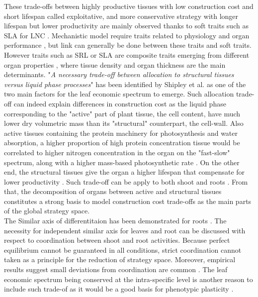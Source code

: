 These trade-offs between highly productive tissues with low construction cost and short lifespan called exploitative, and more conservative strategy with longer lifespan but lower productivity are mainly observed thanks to soft traits such as SLA for LNC \cite{wright_worldwide_2004}. Mechanistic model require traits related to physiology and organ performance \cite{soussana_gemini:_2012, lohier_explaining_2014}, but link can generally be done between these traits and soft traits. However traits such as SRL or SLA are composite traits emerging from different organ properties \cite{ryser_importance_1996,john_anatomical_2017}, where tissue density and organ thickness are the main determinants. "\textit{A necessary trade-off between allocation to structural tissues versus liquid phase processes}" has been identified by Shipley et al. \cite{shipley_fundamental_2006} as one of the two main factors for the leaf economic spectrum to emerge. Such allocation trade-off can indeed explain differences in construction cost as the liquid phase corresponding to the "active" part of plant tissue, the cell content, have much lower dry volumetric mass than its "structural" counterpart, the cell-wall. Also active tissues containing the protein machinery for photosynthesis and water absorption, a higher proportion of high protein concentration tissue would be correlated to higher nitrogen concentration in the organ on the "fast-slow" spectrum, along with a higher mass-based photosynthetic rate \cite{reich_world-wide_2014}. On the other end, the structural tissues give the organ a higher lifespan \cite{mediavilla_internal_2001, ryser_importance_1996} that compensate for lower productivity \cite{westoby_time_2000}. Such trade-off can be apply to both shoot and roots \cite{craine_functional_2002, tjoelker_linking_2005, reich_world-wide_2014}. From that, the decomposition of organs between active and structural tissues constitutes a strong basis to model construction cost trade-offs as the main parts of the global strategy space.\\

The Similar axis of differentitaion has been demonstrated for roots \cite{ reich_world-wide_2014, tjoelker_linking_2015}. The necessity for independent similar axis for leaves and root can be discussed with respect to coordination between shoot and root activities. Because perfect equilibrium cannot be guaranteed in all conditions, strict coordination cannot taken as a principle for the reduction of strategy space. Moreover, empirical results suggest small deviations from coordination are common \cite{freschet_explaining_2015}. The leaf economic spectrum being conserved at the intra-specific level \cite{ hu_novel_2015} is another reason to include such trade-of as it would be a good basis for phenotypic plasticity \cite{freschet_plasticity_2013}.\\


